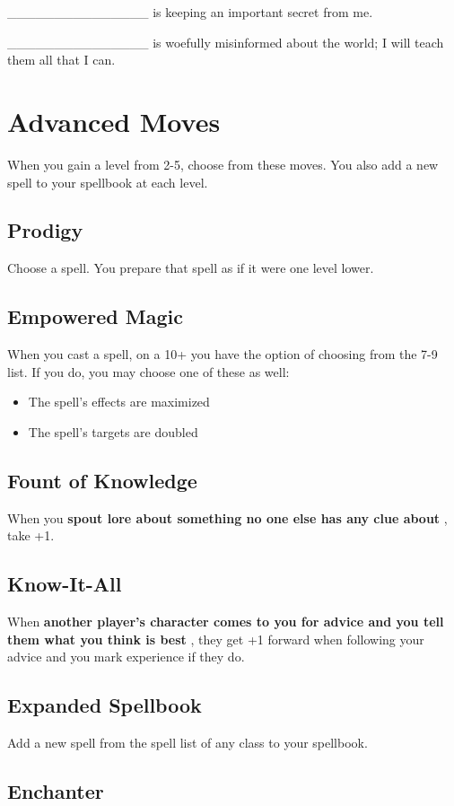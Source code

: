  \_\_\_\_\_\_\_\_\_\_\_\_\_\_\_ is keeping an important secret from me.


 \_\_\_\_\_\_\_\_\_\_\_\_\_\_\_ is woefully misinformed about the world; I will teach them all that I can.
\section{Advanced Moves}


 {\Large When you gain a level from 2-5, choose from these moves. You also add a new spell to your spellbook at each level.}
\subsection{Prodigy}


 Choose a spell. You prepare that spell as if it were one level lower.
\subsection{Empowered Magic}


 When you cast a spell, on a 10+ you have the option of choosing from the 7-9 list. If you do, you may choose one of these as well:
\begin{itemize}
\item The spell's effects are maximized
\item The spell's targets are doubled

\end{itemize}
\subsection{Fount of Knowledge}


 When you \textbf{spout lore about something no one else has any clue about}
, take +1.
\subsection{Know-It-All}


 When \textbf{another player's character comes to you for advice and you tell them what you think is best}
, they get +1 forward when following your advice and you mark experience if they do.
\subsection{Expanded Spellbook}


 Add a new spell from the spell list of any class to your spellbook.
\subsection{Enchanter}


